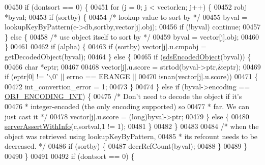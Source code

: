\begin{DoxyCode}
00450     \textcolor{keywordflow}{if} (dontsort == 0) \{
00451         \textcolor{keywordflow}{for} (j = 0; j < vectorlen; j++) \{
00452             robj *byval;
00453             \textcolor{keywordflow}{if} (sortby) \{
00454                 \textcolor{comment}{/* lookup value to sort by */}
00455                 byval = lookupKeyByPattern(c->db,sortby,vector[j].obj);
00456                 \textcolor{keywordflow}{if} (!byval) \textcolor{keywordflow}{continue};
00457             \} \textcolor{keywordflow}{else} \{
00458                 \textcolor{comment}{/* use object itself to sort by */}
00459                 byval = vector[j].obj;
00460             \}
00461 
00462             \textcolor{keywordflow}{if} (alpha) \{
00463                 \textcolor{keywordflow}{if} (sortby) vector[j].u.cmpobj = getDecodedObject(byval);
00464             \} \textcolor{keywordflow}{else} \{
00465                 \textcolor{keywordflow}{if} (\hyperlink{server_8h_afcfb5bd97af52d1dbce331745cae030c}{sdsEncodedObject}(byval)) \{
00466                     \textcolor{keywordtype}{char} *eptr;
00467 
00468                     vector[j].u.score = strtod(byval->ptr,&eptr);
00469                     \textcolor{keywordflow}{if} (eptr[0] != \textcolor{stringliteral}{'\(\backslash\)0'} || errno == ERANGE ||
00470                         isnan(vector[j].u.score))
00471                     \{
00472                         int\_convertion\_error = 1;
00473                     \}
00474                 \} \textcolor{keywordflow}{else} \textcolor{keywordflow}{if} (byval->encoding == \hyperlink{server_8h_ae934cf008a0be0ef009c92c2d006a816}{OBJ\_ENCODING\_INT}) \{
00475                     \textcolor{comment}{/* Don't need to decode the object if it's}
00476 \textcolor{comment}{                     * integer-encoded (the only encoding supported) so}
00477 \textcolor{comment}{                     * far. We can just cast it */}
00478                     vector[j].u.score = (\textcolor{keywordtype}{long})byval->ptr;
00479                 \} \textcolor{keywordflow}{else} \{
00480                     \hyperlink{server_8h_a7308f76cbff9a8d3797fe78190b91282}{serverAssertWithInfo}(c,sortval,1 != 1);
00481                 \}
00482             \}
00483 
00484             \textcolor{comment}{/* when the object was retrieved using lookupKeyByPattern,}
00485 \textcolor{comment}{             * its refcount needs to be decreased. */}
00486             \textcolor{keywordflow}{if} (sortby) \{
00487                 decrRefCount(byval);
00488             \}
00489         \}
00490     \}
00491 
00492     \textcolor{keywordflow}{if} (dontsort == 0) \{

\end{DoxyCode}
